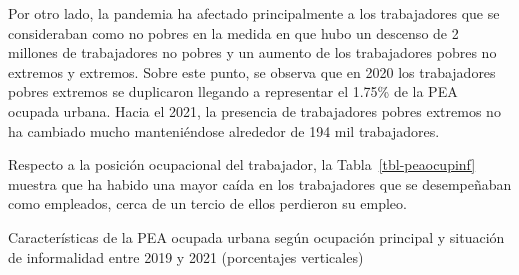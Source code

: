 \documentclass[
  letterpaper,
  12pt,
  oneside,
  spanish,
  doublespacing,
  headsepline,
  parskip]{MastersDoctoralThesis}
\begin{document}
Por otro lado, la pandemia ha afectado principalmente a los trabajadores
que se consideraban como no pobres en la medida en que hubo un descenso
de 2 millones de trabajadores no pobres y un aumento de los trabajadores
pobres no extremos y extremos. Sobre este punto, se observa que en 2020
los trabajadores pobres extremos se duplicaron llegando a representar el
1.75\% de la PEA ocupada urbana. Hacia el 2021, la presencia de
trabajadores pobres extremos no ha cambiado mucho manteniéndose
alrededor de 194 mil trabajadores.

Respecto a la posición ocupacional del trabajador, la
Tabla~\ref{tbl-peaocupinf} muestra que ha habido una mayor caída en los
trabajadores que se desempeñaban como empleados, cerca de un tercio de
ellos perdieron su empleo.

\hypertarget{tbl-peaocupinf}{}
\begin{table}[H]
\caption{\label{tbl-peaocupinf}Características de la PEA ocupada urbana según ocupación principal y
situación de informalidad entre 2019 y 2021 (porcentajes verticales) }\tabularnewline

\centering\begingroup\fontsize{10}{12}\selectfont


\end{table}
\end{document}
